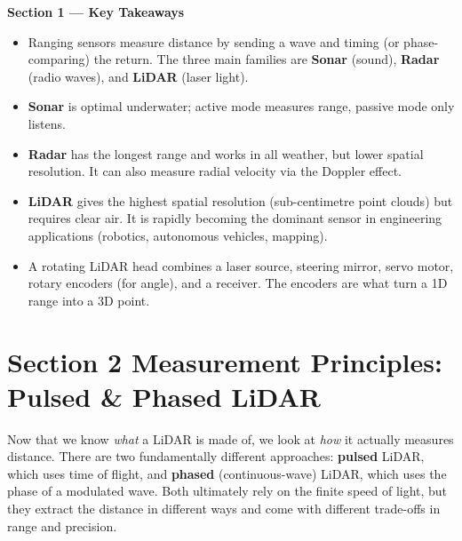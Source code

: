 \documentclass[12pt, a4paper]{article}
\begin{document}
\begin{keybox}
  \textbf{Section 1 --- Key Takeaways}
  \begin{itemize}[leftmargin=1.2em,itemsep=2pt]
    \item Ranging sensors measure distance by sending a wave and timing (or
      phase-comparing) the return.  The three main families are
      \textbf{Sonar} (sound), \textbf{Radar} (radio waves), and
      \textbf{LiDAR} (laser light).
    \item \textbf{Sonar} is optimal underwater; active mode measures range,
      passive mode only listens.
    \item \textbf{Radar} has the longest range and works in all weather, but
      lower spatial resolution.  It can also measure radial velocity via the
      Doppler effect.
    \item \textbf{LiDAR} gives the highest spatial resolution (sub-centimetre
      point clouds) but requires clear air.  It is rapidly becoming the
      dominant sensor in engineering applications (robotics, autonomous
      vehicles, mapping).
    \item A rotating LiDAR head combines a laser source, steering mirror,
      servo motor, rotary encoders (for angle), and a receiver.  The encoders
      are what turn a 1D range into a 3D point.
  \end{itemize}
\end{keybox}

\newpage
\section*{Section 2 \quad Measurement Principles: Pulsed \& Phased LiDAR}

Now that we know \emph{what} a LiDAR is made of, we look at \emph{how} it
actually measures distance.
There are two fundamentally different approaches: \textbf{pulsed} LiDAR, which
uses time of flight, and \textbf{phased} (continuous-wave) LiDAR, which uses
the phase of a modulated wave.
Both ultimately rely on the finite speed of light, but they extract the
distance in different ways and come with different trade-offs in range and
precision.

\end{document}
